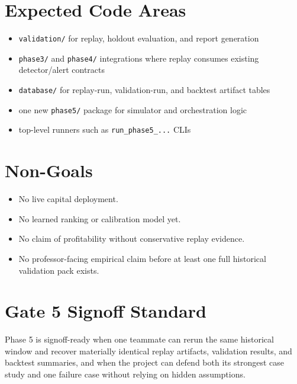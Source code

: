 \documentclass{article}
\begin{document}
\section*{Expected Code Areas}
\begin{itemize}
\item \texttt{validation/} for replay, holdout evaluation, and report generation
\item \texttt{phase3/} and \texttt{phase4/} integrations where replay consumes existing detector/alert contracts
\item \texttt{database/} for replay-run, validation-run, and backtest artifact tables
\item one new \texttt{phase5/} package for simulator and orchestration logic
\item top-level runners such as \texttt{run\_phase5\_...} CLIs
\end{itemize}

\section*{Non-Goals}
\begin{itemize}
\item No live capital deployment.
\item No learned ranking or calibration model yet.
\item No claim of profitability without conservative replay evidence.
\item No professor-facing empirical claim before at least one full historical validation pack exists.
\end{itemize}

\section*{Gate 5 Signoff Standard}
Phase 5 is signoff-ready when one teammate can rerun the same historical window and recover materially identical replay artifacts, validation results, and backtest summaries, and when the project can defend both its strongest case study and one failure case without relying on hidden assumptions.
\end{document}

